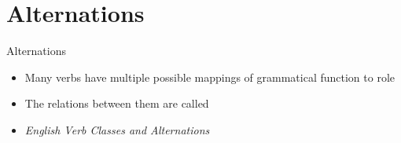 \section{Alternations}


\begin{frame}{Alternations}
\begin{itemize}
\item  Many verbs have multiple possible mappings of grammatical function to role
  \begin{exe}
    \ex
    \begin{xlist}
      \ex{}
      \ex{}
      \ex{}
    \end{xlist}
    \ex
    \begin{xlist}
      \ex{}
      \ex{}
    \end{xlist}
  \end{exe}  
\item  The relations between them are called 
\item  \textit{English Verb Classes and Alternations} \citep{Levin:1993}
\end{itemize}


\end{frame}

